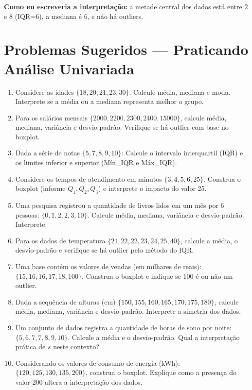 \begin{SolvedBox}
\textbf{Como eu escreveria a interpretação:} a metade central dos dados está entre $2$ e $8$ (IQR=6), a mediana é $6$, e não há outliers.
\end{SolvedBox}

\clearpage
\section*{Problemas Sugeridos — Praticando Análise Univariada}

\begin{enumerate}[leftmargin=*]

  \item Considere as idades $\{18, 20, 21, 23, 30\}$.  
  Calcule média, mediana e moda. Interprete se a média ou a mediana representa melhor o grupo.

  \item Para os salários mensais $\{2000, 2200, 2300, 2400, 15000\}$, calcule média, mediana, variância e desvio-padrão.  
  Verifique se há outlier com base no boxplot.

  \item Dada a série de notas $\{5, 7, 8, 9, 10\}$:  
  Calcule o intervalo interquartil (IQR) e os limites inferior e superior (Mín\_IQR e Máx\_IQR).

  \item Considere os tempos de atendimento em minutos $\{3, 4, 5, 6, 25\}$.  
  Construa o boxplot (informe $Q_1, Q_2, Q_3$) e interprete o impacto do valor 25.

  \item Uma pesquisa registrou a quantidade de livros lidos em um mês por 6 pessoas: $\{0, 1, 2, 2, 3, 10\}$.  
  Calcule média, mediana, variância e desvio-padrão. Interprete.

  \item Para os dados de temperatura $\{21, 22, 22, 23, 24, 25, 40\}$, calcule a média, o desvio-padrão e verifique se há outlier pelo método do IQR.

  \item Uma base contém os valores de vendas (em milhares de reais): $\{15, 16, 16, 17, 18, 100\}$.  
  Construa o boxplot e indique se 100 é ou não um outlier.

  \item Dada a sequência de alturas (cm) $\{150, 155, 160, 165, 170, 175, 180\}$, calcule média, mediana, variância e desvio-padrão.  
  Interprete a simetria dos dados.

  \item Um conjunto de dados registra a quantidade de horas de sono por noite: $\{5, 6, 7, 7, 8, 9, 10\}$.  
  Calcule a média e o desvio-padrão. Qual a interpretação prática de $s$ neste contexto?

  \item Considerando os valores de consumo de energia (kWh): $\{120, 125, 130, 135, 200\}$, construa o boxplot.  
  Explique como a presença do valor 200 altera a interpretação dos dados.

\end{enumerate}







